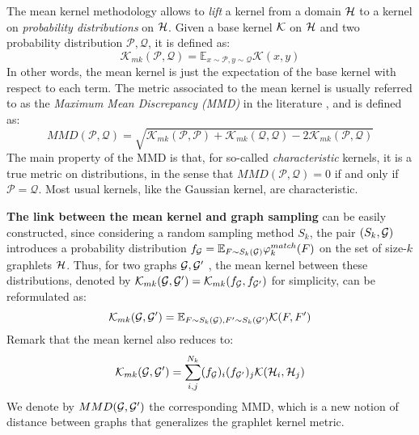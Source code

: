 The mean kernel methodology allows to \emph{lift} a kernel from a domain $\mathcal{H}$ to a kernel on \emph{probability distributions} on $\mathcal{H}$. Given a base kernel $\mathcal{K}$ on $\mathcal{H}$ and two probability distribution $\mathcal{P},\mathcal{Q}$, it is defined as:
\begin{equation}
\label{eq:mean_kernel}
\mathcal{K}_{mk}(\mathcal{P},\mathcal{Q}) = \mathbb{E}_{x \sim \mathcal{P}, y \sim \mathcal{Q}} \mathcal{K}(x,y)
\end{equation}
In other words, the mean kernel is just the expectation of the base kernel with respect to each term. The metric associated to the mean kernel is usually referred to as the \emph{Maximum Mean Discrepancy (MMD)} in the literature \citep{gretton}, and is defined as:
\begin{equation}\label{eq:MMD}
MMD(\mathcal{P},\mathcal{Q}) = \sqrt{\mathcal{K}_{mk}(\mathcal{P},\mathcal{P}) + \mathcal{K}_{mk}(\mathcal{Q},\mathcal{Q}) - 2\mathcal{K}_{mk}(\mathcal{P},\mathcal{Q})}
\end{equation}
The main property of the MMD is that, for so-called \emph{characteristic} kernels, it is a true metric on distributions, in the sense that $MMD(\mathcal{P}, \mathcal{Q}) = 0$ if and only if $\mathcal{P} = \mathcal{Q}$. Most usual kernels, like the Gaussian kernel, are characteristic.

\textbf{The link between the mean kernel and graph sampling} can be easily constructed, since considering a random sampling method $S_k$, the pair $(S_k , \mathcal{G})$  introduces a probability distribution $f_{\mathcal{G}}= \mathbb{E}_{F \sim S_k(\mathcal{G})} \varphi^{match}_k(F)$ on the set of size-$k$ graphlets $\mathcal{H}$. Thus, for two graphs $\mathcal{G},\mathcal{G}'$ , the mean kernel between these distributions, denoted by $\mathcal{K}_{mk}(\mathcal{G},\mathcal{G}')=\mathcal{K}_{mk}(f_{\mathcal{G}},f_{\mathcal{G}'})$ for simplicity, can be reformulated as:
\begin{equation}
\label{eq:mean_kernel_graphs}
\mathcal{K}_{mk}(\mathcal{G},\mathcal{G}') = \mathbb{E}_{F \sim S_k(\mathcal{G}), F' \sim S_k(\mathcal{G}')} \mathcal{K}(F,F')
\end{equation}
Remark that the mean kernel also reduces to:
\[
\mathcal{K}_{mk}(\mathcal{G},\mathcal{G}')=\sum_{i,j}^{N_k}(f_{\mathcal{G}})_i(f_{\mathcal{G}'})_j\mathcal{K}(\mathcal{H}_i,\mathcal{H}_j) 
\]
We denote by $MMD(\mathcal{G},\mathcal{G}')$ the corresponding MMD, which is a new notion of distance between graphs that generalizes the graphlet kernel metric.

